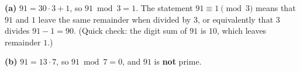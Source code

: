\textbf{(a)} $91=30\cdot3+1$, so $91\bmod3=\boxed{1}$. The statement $91\equiv1\pmod3$ means that $91$ and $1$ leave the same remainder when divided by $3$, or equivalently that $3$ divides $91-1=90$. (Quick check: the digit sum of $91$ is $10$, which leaves remainder $1$.)

\textbf{(b)} $91=13\cdot7$, so $91\bmod7=\boxed{0}$, and $91$ is \textbf{not} prime.
